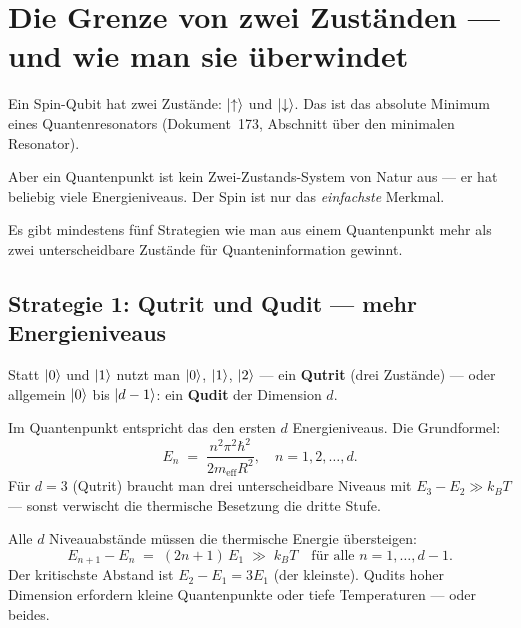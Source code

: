 \section{Die Grenze von zwei Zuständen --- und wie man sie überwindet}
\label{sec:jenseits-spin}

Ein Spin-Qubit hat zwei Zustände: $\left|\uparrow\right\rangle$ und $\left|\downarrow\right\rangle$.
Das ist das absolute Minimum eines Quantenresonators
(Dokument~173, Abschnitt über den minimalen Resonator).

Aber ein Quantenpunkt ist kein Zwei-Zustands-System von Natur aus ---
er hat beliebig viele Energieniveaus.
Der Spin ist nur das \textit{einfachste} Merkmal.

Es gibt mindestens fünf Strategien wie man aus einem
Quantenpunkt mehr als zwei unterscheidbare Zustände
für Quanteninformation gewinnt.

\subsection{Strategie 1: Qutrit und Qudit --- mehr Energieniveaus}
\label{sec:qudit}

Statt $\left|0\right\rangle$ und $\left|1\right\rangle$ nutzt man $\left|0\right\rangle$, $\left|1\right\rangle$, $\left|2\right\rangle$
--- ein \textbf{Qutrit} (drei Zustände) ---
oder allgemein $\left|0\right\rangle$ bis $\left|d-1\right\rangle$:
ein \textbf{Qudit} der Dimension $d$.

Im Quantenpunkt entspricht das den ersten $d$ Energieniveaus.
Die Grundformel:
\begin{equation}
  E_n \;=\; \frac{n^2 \pi^2 \hbar^2}{2m_\text{eff} R^2},
  \quad n = 1, 2, \ldots, d.
\end{equation}
Für $d = 3$ (Qutrit) braucht man drei unterscheidbare Niveaus
mit $E_3 - E_2 \gg k_BT$ --- sonst verwischt die thermische
Besetzung die dritte Stufe.

\begin{important}
Alle $d$ Niveauabstände müssen die thermische Energie übersteigen:
\[
  E_{n+1} - E_n \;=\; (2n+1)\,E_1 \;\gg\; k_BT
  \quad \text{für alle } n = 1,\ldots,d-1.
\]
Der kritischste Abstand ist $E_2 - E_1 = 3E_1$ (der kleinste).
Qudits hoher Dimension erfordern kleine Quantenpunkte
oder tiefe Temperaturen --- oder beides.
\end{important}

